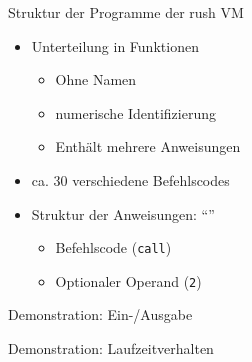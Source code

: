 \begin{frame}{Struktur der Programme der rush VM}
	\begin{itemize}
		\item<1-> Unterteilung in Funktionen
		      \begin{itemize}
			      \item<2-> Ohne Namen
			      \item<3-> numerische Identifizierung
			      \item<4-> Enthält mehrere Anweisungen
		      \end{itemize}
		\item<5-> ca. 30 verschiedene Befehlscodes
		\item<6-> Struktur der Anweisungen: \enquote{}
		      \begin{itemize}
			      \item<7-> Befehlscode (\texttt{call})
			      \item<8-> Optionaler Operand (\texttt{2})
		      \end{itemize}
	\end{itemize}
\end{frame}

\begin{frame}{Demonstration: Ein-/Ausgabe}
	\begin{minipage}{0.5\textwidth}
		\centering
	\end{minipage}
	\hfill
	\begin{minipage}{0.35\textwidth}
	\end{minipage}
\end{frame}

\begin{frame}{Demonstration: Laufzeitverhalten}
	\begin{figure}[H]
		\href{run:assets/01_rush_presentation_vm.mkv}{
		}
	\end{figure}
\end{frame}

